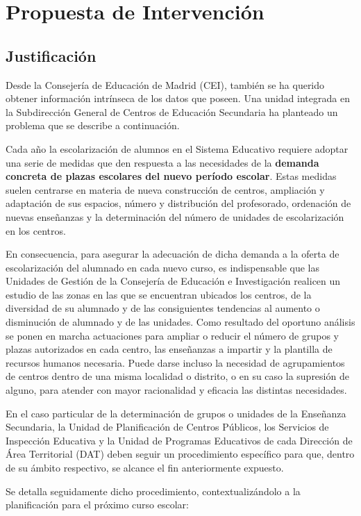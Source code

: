 \chapter{Propuesta de Intervención}
\section{Justificación}
Desde la Consejería de Educación de Madrid (CEI), también se ha querido obtener información intrínseca de los datos que poseen. Una unidad integrada en la Subdirección General de Centros de Educación Secundaria ha planteado un problema que se describe a continuación.

Cada año la escolarización de alumnos en el Sistema Educativo requiere adoptar una serie de medidas que den respuesta a las necesidades de la \textbf{demanda concreta de plazas escolares del nuevo período escolar}. Estas medidas suelen centrarse en materia de nueva construcción de centros, ampliación y adaptación de sus espacios, número y distribución del profesorado, ordenación de nuevas enseñanzas y la determinación del número de unidades de escolarización en los centros.

En consecuencia, para asegurar la adecuación de dicha demanda a la oferta de escolarización del alumnado en cada nuevo curso, es indispensable que las Unidades de Gestión de la Consejería de Educación e Investigación realicen un estudio de las zonas en las que se encuentran ubicados los centros, de la diversidad de su alumnado y de las consiguientes tendencias al aumento o disminución de alumnado y de las unidades. Como resultado del oportuno análisis se ponen en marcha actuaciones para ampliar o reducir el número de grupos y plazas autorizados en cada centro, las enseñanzas a impartir y la plantilla de recursos humanos necesaria. Puede darse incluso la necesidad de agrupamientos de centros dentro de una misma localidad o distrito, o en su caso la supresión de alguno, para atender con mayor racionalidad y eficacia las distintas necesidades.

En el caso particular de la determinación de grupos o unidades de la Enseñanza Secundaria, la Unidad de Planificación de Centros Públicos, los Servicios de Inspección Educativa y la Unidad de Programas Educativos de cada Dirección de Área Territorial (DAT) deben seguir un procedimiento específico para que, dentro de su ámbito respectivo, se alcance el fin anteriormente expuesto. 

Se detalla seguidamente dicho procedimiento, contextualizándolo a la planificación para el próximo curso escolar: 


